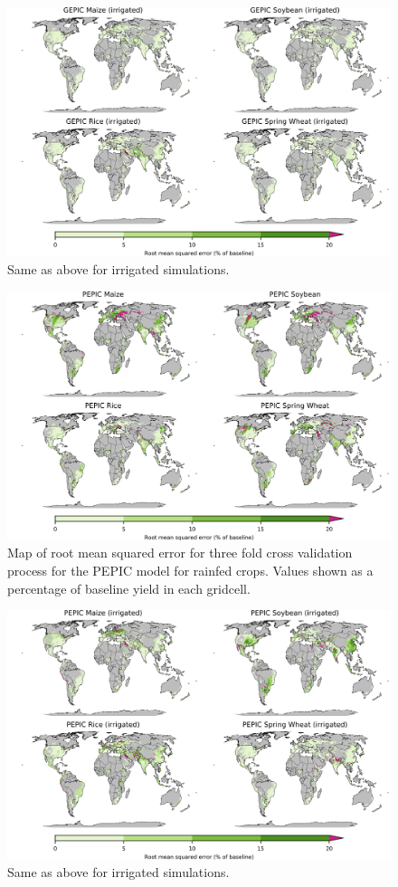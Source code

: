 \documentclass[10pt]{article}
\begin{document}
\begin{figure}[h!]
\centering
\includegraphics[width=15.5cm]{GEPIC_spatial_MSE_ton_ha_irr.png}
\caption{Same as above for irrigated simulations.}
\label{fig:pdssatrmseirr}
\end{figure}

\begin{figure}[h!]
\centering
\includegraphics[width=15.5cm]{PEPIC_spatial_MSE_ton_ha.png}
\caption{Map of root mean squared error for three fold cross validation process for the PEPIC model for rainfed crops. Values shown as a percentage of baseline yield in each gridcell.}
\label{fig:pdssatrmse}
\end{figure}

\begin{figure}[h!]
\centering
\includegraphics[width=15.5cm]{PEPIC_spatial_MSE_ton_ha_irr.png}
\caption{Same as above for irrigated simulations.}
\label{fig:pdssatrmseirr}
\end{figure}
\end{document}
